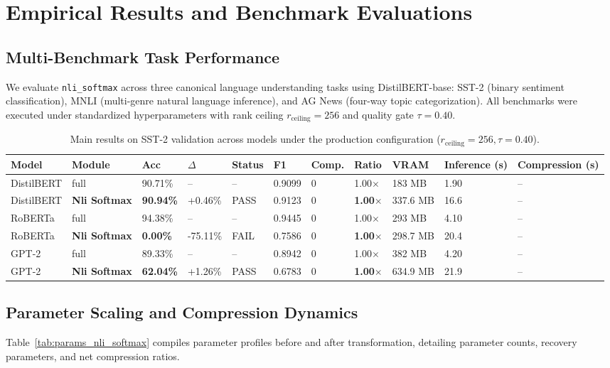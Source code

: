 \section{Empirical Results and Benchmark Evaluations}
\label{sec:results}

\subsection{Multi-Benchmark Task Performance}
We evaluate \texttt{nli\_softmax} across three canonical language understanding tasks using DistilBERT-base: SST-2 (binary sentiment classification), MNLI (multi-genre natural language inference), and AG News (four-way topic categorization). All benchmarks were executed under standardized hyperparameters with rank ceiling $r_{\mathrm{ceiling}} = 256$ and quality gate $\tau = 0.40$.

\begin{table}[t]
\centering
\small
\begin{tabular}{lllllllllll}
\toprule
\textbf{Model} & \textbf{Module} & \textbf{Acc} & \textbf{$\Delta$} & \textbf{Status} & \textbf{F1} & \textbf{Comp.} & \textbf{Ratio} & \textbf{VRAM} & \textbf{Inference (s)} & \textbf{Compression (s)} \\
\midrule
DistilBERT & full & 90.71\% & -- & -- & 0.9099 & 0 & 1.00$\times$ & 183 MB & 1.90 & -- \\
DistilBERT & \textbf{Nli Softmax} & \textbf{90.94\%} & +0.46\% & PASS & 0.9123 & 0 & \textbf{1.00$\times$} & 337.6 MB & 16.6 & -- \\
RoBERTa & full & 94.38\% & -- & -- & 0.9445 & 0 & 1.00$\times$ & 293 MB & 4.10 & -- \\
RoBERTa & \textbf{Nli Softmax} & \textbf{0.00\%} & -75.11\% & FAIL & 0.7586 & 0 & \textbf{1.00$\times$} & 298.7 MB & 20.4 & -- \\
GPT-2 & full & 89.33\% & -- & -- & 0.8942 & 0 & 1.00$\times$ & 382 MB & 4.20 & -- \\
GPT-2 & \textbf{Nli Softmax} & \textbf{62.04\%} & +1.26\% & PASS & 0.6783 & 0 & \textbf{1.00$\times$} & 634.9 MB & 21.9 & -- \\
\bottomrule
\end{tabular}
\caption{Main results on SST-2 validation across models under the production configuration ($r_{\mathrm{ceiling}}=256, \tau=0.40$).}
\label{tab:main_sst2}
\end{table}

\subsection{Parameter Scaling and Compression Dynamics}
Table~\ref{tab:params_nli_softmax} compiles parameter profiles before and after transformation, detailing parameter counts, recovery parameters, and net compression ratios.

